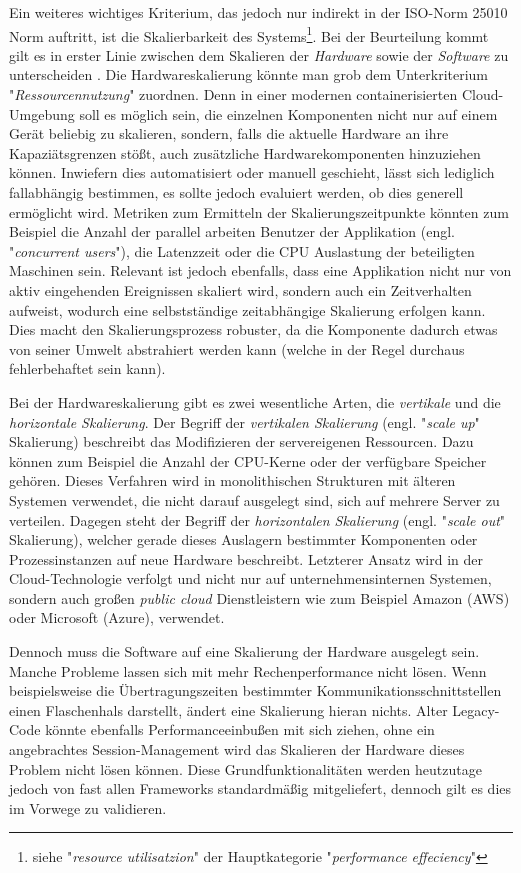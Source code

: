Ein weiteres wichtiges Kriterium, das jedoch nur indirekt in der ISO-Norm 25010 Norm auftritt, ist die Skalierbarkeit des Systems\footnote{siehe "\emph{resource utilisatzion}" der Hauptkategorie "\emph{performance effeciency}"}. Bei der Beurteilung kommt gilt es in erster Linie zwischen dem Skalieren der \emph{Hardware} sowie der \emph{Software} zu unterscheiden \cite{nfr-dotnetcurry}. Die Hardwareskalierung könnte man grob dem Unterkriterium "\emph{Ressourcennutzung}" zuordnen. Denn in einer modernen containerisierten Cloud-Umgebung soll es möglich sein, die einzelnen Komponenten nicht nur auf einem Gerät beliebig zu skalieren, sondern, falls die aktuelle Hardware an ihre Kapaziätsgrenzen stößt, auch zusätzliche Hardwarekomponenten hinzuziehen können. Inwiefern dies automatisiert oder manuell geschieht, lässt sich lediglich fallabhängig bestimmen, es sollte jedoch evaluiert werden, ob dies generell ermöglicht wird. Metriken zum Ermitteln der Skalierungszeitpunkte könnten zum Beispiel die Anzahl der parallel arbeiten Benutzer der Applikation (engl. "\emph{concurrent users}"), die Latenzzeit oder die CPU Auslastung der beteiligten Maschinen sein. Relevant ist jedoch ebenfalls, dass eine Applikation nicht nur von aktiv eingehenden Ereignissen skaliert wird, sondern auch ein Zeitverhalten aufweist, wodurch eine selbstständige zeitabhängige Skalierung erfolgen kann. Dies macht den Skalierungsprozess robuster, da die Komponente dadurch etwas von seiner Umwelt abstrahiert werden kann (welche in der Regel durchaus fehlerbehaftet sein kann). 

Bei der Hardwareskalierung gibt es zwei wesentliche Arten, die \emph{vertikale} und die \emph{horizontale Skalierung}. Der Begriff der \emph{vertikalen Skalierung} (engl. "\emph{scale up}" Skalierung) beschreibt das Modifizieren der servereigenen Ressourcen. Dazu können zum Beispiel die Anzahl der CPU-Kerne oder der verfügbare Speicher gehören. Dieses Verfahren wird in monolithischen Strukturen mit älteren Systemen verwendet, die nicht darauf ausgelegt sind, sich auf mehrere Server zu verteilen. Dagegen steht der Begriff der \emph{horizontalen Skalierung} (engl. "\emph{scale out}" Skalierung), welcher gerade dieses Auslagern bestimmter Komponenten oder Prozessinstanzen auf neue Hardware beschreibt. Letzterer Ansatz wird in der Cloud-Technologie verfolgt und nicht nur auf unternehmensinternen Systemen, sondern auch großen \emph{public cloud} Dienstleistern wie zum Beispiel Amazon (AWS) oder Microsoft (Azure), verwendet.

Dennoch muss die Software auf eine Skalierung der Hardware ausgelegt sein. Manche Probleme lassen sich mit mehr Rechenperformance nicht lösen. Wenn beispielsweise die Übertragungszeiten bestimmter Kommunikationsschnittstellen einen Flaschenhals darstellt, ändert eine Skalierung hieran nichts. Alter Legacy-Code könnte ebenfalls Performanceeinbußen mit sich ziehen, ohne ein angebrachtes Session-Management wird das Skalieren der Hardware dieses Problem nicht lösen können. Diese Grundfunktionalitäten werden heutzutage jedoch von fast allen Frameworks standardmäßig mitgeliefert, dennoch gilt es dies im Vorwege zu validieren. 



